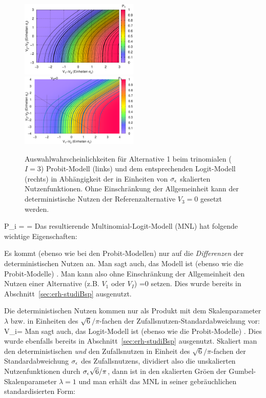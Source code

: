 \begin{figure}
 \includegraphics[width=0.5\textwidth]{./figsDiscr/p1ProbitTrinom_V1V2.eps}   
 \includegraphics[width=0.5\textwidth]{./figsDiscr/pLogitTrinom_V1V2.eps}   
  \caption{\label{fig:pTrinom}Auswahlwahrscheinlichkeiten f\"ur
Alternative 1 beim trinomialen ($I=3$) Probit-Modell (links) und dem
entsprechenden Logit-Modell (rechts) in
Abh\"angigkeit der in Einheiten von $\sigma_{\epsilon}$ skalierten Nutzenfunktionen. Ohne
Einschr\"ankung der Allgemeinheit kann der deterministische Nutzen
der Referenzalternative $V_3=0$ gesetzt werden.
}
\end{figure}
%
\be
\label{MNLunscaled}
P_i =
=
\ee
Das resultierende Multinomial-Logit-Modell (MNL)  hat folgende
wichtige Eigenschaften:
\bi
\item Es kommt (ebenso wie bei den
Probit-Modellen) nur auf die \textit{Differenzen} der deterministischen
Nutzen an. Man sagt auch, das Modell ist (ebenso wie die
Probit-Modelle) . Man kann also ohne
Einschr\"ankung der Allgemeinheit den Nutzen einer Alternative (z.B.
$V_1$ oder $V_I$) =0 setzen. Dies wurde bereits in
Abschnitt~\ref{sec:erh-studiBsp} ausgenutzt.

\item Die deterministischen Nutzen kommen nur als Produkt mit dem
Skalenparameter $\lambda$ bzw. in Einheiten des $\sqrt{6}/\pi$-fachen
der Zufallsnutzen-Standardabweichung vor:
\be
\label{logit-skalierung}
\lambda V_i= 
\ee
Man sagt auch, das Logit-Modell ist (ebenso wie die
Probit-Modelle) . Dies wurde ebenfalls bereits
in  Abschnitt~\ref{sec:erh-studiBsp} ausgenutzt.
Skaliert man den
deterministischen \emph{und} den Zufallsnutzen in  Einheit des
$\sqrt{6}/\pi$-fachen der Standardabweichung $\sigma_{\epsilon}$ des
Zufallsnutzens, dividiert also die unskalierten Nutzenfunktionen durch
$\sigma_{\epsilon} \sqrt{6}/\pi$, dann ist in den skalierten Gr\"o\3en der
Gumbel-Skalenparameter $\lambda=1$ und man  erh\"alt das MNL in seiner
gebr\"auchlichen standardisierten Form: 

